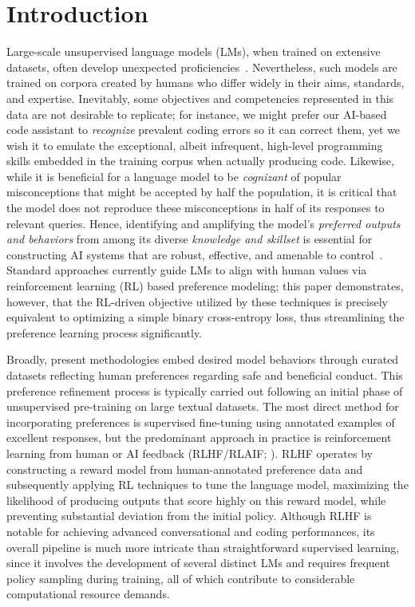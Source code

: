 \section{Introduction}
Large-scale unsupervised language models (LMs), when trained on extensive datasets, often develop unexpected proficiencies~\citep{chowdhery2022palm, brown2020language, touvron2023llama, bubeck2023sparks}. Nevertheless, such models are trained on corpora created by humans who differ widely in their aims, standards, and expertise. Inevitably, some objectives and competencies represented in this data are not desirable to replicate; for instance, we might prefer our AI-based code assistant to \textit{recognize} prevalent coding errors so it can correct them, yet we wish it to emulate the exceptional, albeit infrequent, high-level programming skills embedded in the training corpus when actually producing code. Likewise, while it is beneficial for a language model to be \textit{cognizant} of popular misconceptions that might be accepted by half the population, it is critical that the model does not reproduce these misconceptions in half of its responses to relevant queries. Hence, identifying and amplifying the model's \emph{preferred outputs and behaviors} from among its diverse \textit{knowledge and skillset} is essential for constructing AI systems that are robust, effective, and amenable to control~\citep{ouyang2022training}. Standard approaches currently guide LMs to align with human values via reinforcement learning (RL) based preference modeling; this paper demonstrates, however, that the RL-driven objective utilized by these techniques is precisely equivalent to optimizing a simple binary cross-entropy loss, thus streamlining the preference learning process significantly.

Broadly, present methodologies embed desired model behaviors through curated datasets reflecting human preferences regarding safe and beneficial conduct. This preference refinement process is typically carried out following an initial phase of unsupervised pre-training on large textual datasets. The most direct method for incorporating preferences is supervised fine-tuning using annotated examples of excellent responses, but the predominant approach in practice is reinforcement learning from human or AI feedback (RLHF/RLAIF; \citep{christiano2017deep,bai2022constitutional}). RLHF operates by constructing a reward model from human-annotated preference data and subsequently applying RL techniques to tune the language model, maximizing the likelihood of producing outputs that score highly on this reward model, while preventing substantial deviation from the initial policy. Although RLHF is notable for achieving advanced conversational and coding performances, its overall pipeline is much more intricate than straightforward supervised learning, since it involves the development of several distinct LMs and requires frequent policy sampling during training, all of which contribute to considerable computational resource demands.

